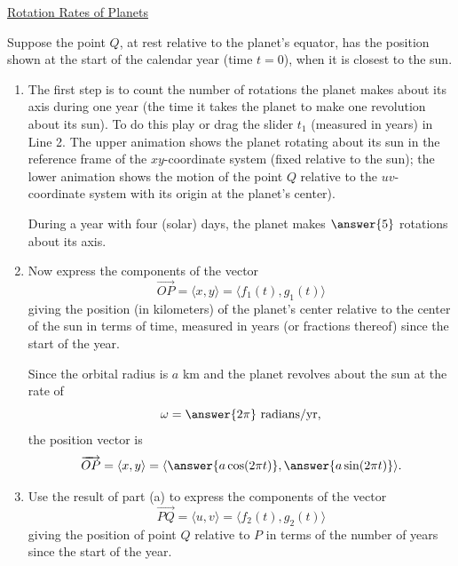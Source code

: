 \documentclass{ximera}
\begin{document}

 
\begin{onlineOnly}
    \begin{center}
\end{center}
\end{onlineOnly}

\href{https://www.desmos.com/calculator/golluueo9z}{Rotation Rates of Planets}

Suppose the point $Q$, at rest relative to the planet's equator, has the position shown at the start of the calendar year (time $t=0$), when it is closest to the sun.

\begin{enumerate}
\item The first step is to count the number of rotations the planet makes about its axis during one year (the time it takes the planet  to make one revolution about its sun). To do this play or drag the slider $t_1$ (measured in years) in Line 2. The upper animation shows the planet rotating about its sun in the reference frame of the $xy$-coordinate system (fixed relative to the sun); the lower animation shows the motion of the point $Q$ relative to the $uv$-coordinate system with its origin at the planet's center). 

During a year with four (solar) days, the planet makes $\answer{5}$ rotations about its axis.

\item Now express the components of the vector
\[
  \overrightarrow{OP}  = \langle x , y\rangle =   \langle f_1(t) , g_1(t) \rangle
\]
giving the position (in kilometers) of the planet's center relative to the center of the sun in terms of time, measured in years (or fractions thereof) since the start of the year.

Since the orbital radius is $a$ km and the planet revolves about the sun at the rate of 
\[
    \omega = \answer{2\pi} \text{ radians/yr},
\]
the position vector is
\[
  \overrightarrow{OP}  = \langle x , y\rangle =  \langle \answer{a\cos (2\pi t)} , \answer{a\sin (2\pi t)} \rangle. 
\]

\item  Use the result of part (a) to express the components of the vector
 \[
  \overrightarrow{PQ} =  \langle u, v \rangle =   \langle f_2(t) , g_2(t) \rangle
\]
giving the position of point $Q$ relative to $P$ in terms of the number of years since the start of the year.


\end{enumerate}
\end{document}
